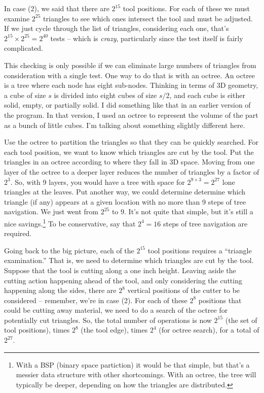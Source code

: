 \documentclass[titlepage,oneside,10pt]{article}
\begin{document}
In case (2), we said that there are $2^{15}$ tool positions. For each
of these we must examine $2^{25}$ triangles to see which ones
intersect the tool and must be adjusted. If we just cycle through the
list of triangles, considering each one, that's 
$2^{15}\times 2^{25} = 2^{40}$ tests -- which is \emph{crazy},
particularly since the test itself is fairly complicated.

This checking is only possible if we can eliminate large numbers of
triangles from consideration with a single test. One way to do
that is with an octree. An octree is a tree where each node has eight
sub-nodes. Thinking in terms of 3D geometry, a cube of size $s$ is
divided into eight cubes of size $s/2$, and each cube is either solid,
empty, or partially solid. I did something like that in an earlier
version of the program. In that version, I used an octree to represent
the volume of the part as a bunch of little cubes. I'm talking about
something slightly different here.

Use the octree to partition the triangles so that they can be quickly
searched. For each tool position, we want to know which triangles are
cut by the tool. Put the triangles in an octree according to where
they fall in 3D space. Moving from one layer of the octree to a
deeper layer reduces the number of triangles by a factor of $2^3$. So,
with 9 layers, you would have a tree with space for $2^{9\times 3} =
2^{27}$ lone triangles at the leaves. Put another way, we could
determine determine which triangle (if any) appears at a given
location with no more than 9 steps of tree navigation. We just went
from $2^{25}$ to 9. It's not quite that simple, but it's still a nice
savings.\footnote{With a BSP (binary space partiction) it would be
that simple, but that's a messier data structure with other
shortcomings. With an octree, the tree will typically be deeper,
depending on how the triangles are distributed.} To be conservative,
say that $2^4=16$ steps of tree navigation are required.

Going back to the big picture, each of the $2^{15}$ tool positions
requires a ``triangle examination.'' That is, we need to determine
which triangles are cut by the tool. Suppose that the tool is cutting
along a one inch height. Leaving aside the cutting action happening
ahead of the tool, and only considering the cutting happening along
the sides, there are $2^8$ vertical positions of the cutter to be
considered -- remember, we're in case (2). For each of these $2^8$
positions that could be cutting away material, we need to do a search
of the octree for potentially cut triangles. So, the total number of
operations is now $2^{15}$ (the set of tool positions), times $2^8$ (the
tool edge), times $2^4$ (for octree search), for a total of
$2^{27}$. 
\end{document}
